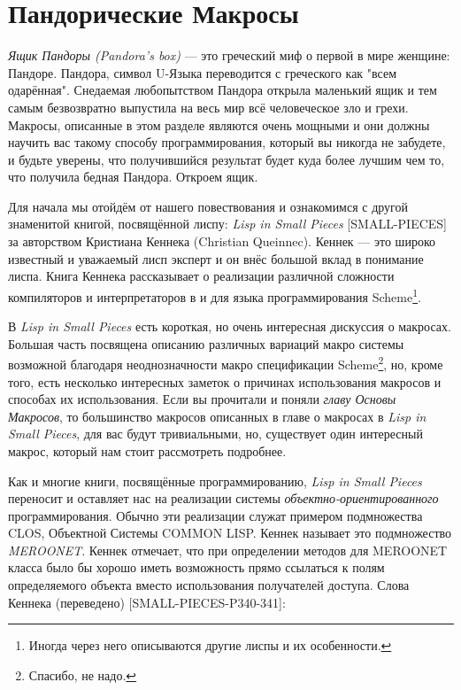 \section{Пандорические Макросы}\label{section_pandoric_macros}



\emph{Ящик Пандоры (Pandora's box)} --- это греческий миф о первой в мире женщине: Пандоре. Пандора, символ U-Языка переводится с греческого как "всем одарённая". Снедаемая любопытством Пандора открыла маленький ящик и тем самым безвозвратно выпустила на весь мир всё человеческое зло и грехи. Макросы, описанные в этом разделе являются очень мощными и они должны научить вас такому способу программирования, который вы никогда не забудете, и будьте уверены, что получившийся результат будет куда более лучшим чем то, что получила бедная Пандора. Откроем ящик.

Для начала мы отойдём от нашего повествования и ознакомимся с другой знаменитой книгой, посвящённой лиспу: \emph{Lisp in Small Pieces} [SMALL-PIECES] за авторством Кристиана Кеннека (\foreignlanguage{english}{Christian Queinnec}). Кеннек --- это широко известный и уважаемый лисп эксперт и он внёс большой вклад в понимание лиспа. Книга Кеннека рассказывает о реализации различной сложности компиляторов и интерпретаторов в и для языка программирования Scheme\footnote{Иногда через него описываются другие лиспы и их особенности.}.

 

В \emph{Lisp in Small Pieces} есть короткая, но очень интересная дискуссия о макросах. Большая часть посвящена описанию различных вариаций макро системы возможной благодаря неоднозначности макро спецификации Scheme\footnote{Спасибо, не надо.}, но, кроме того, есть несколько интересных заметок о причинах использования макросов и способах их использования. Если вы прочитали и поняли \emph{главу Основы Макросов}, то большинство макросов описанных в главе о макросах в \emph{Lisp in Small Pieces}, для вас будут тривиальными, но, существует один интересный макрос, который нам стоит рассмотреть подробнее.



Как и многие книги, посвящённые программированию, \emph{Lisp in Small Pieces} переносит и оставляет нас на реализации системы \emph{объект\-но-ориен\-ти\-ро\-ван\-но\-го} программирования. Обычно эти реализации служат примером подмножества CLOS, Объектной Системы COMMON LISP. Кеннек называет это подмножество \emph{MEROONET}. Кеннек отмечает, что при определении методов для MEROONET класса было бы хорошо иметь возможность прямо ссылаться к полям определяемого объекта вместо использования получателей доступа. Слова Кеннека (переведено) [SMALL-PIECES-P340-341]:

